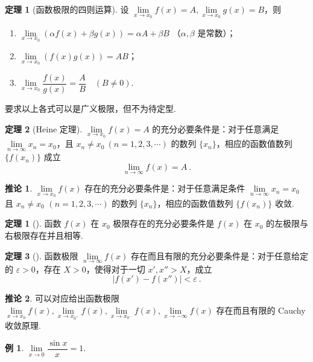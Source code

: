 \documentclass[zihao=-4,linespread=1.8,UTF8,nothm]{aytony_base}
\theoremstyle{definition}
\newtheorem*{theorem*}{\indent\heiti\textbf{定理}}
\newtheorem{theorem}{\indent\heiti\textbf{定理}}[subsection]
\newtheorem*{corollary}{\indent\heiti\textbf{推论}}
\newtheorem{example}{\indent\heiti\textbf{例}}[subsection]
\begin{document}
\begin{theorem}[函数极限的四则运算]
    设 $\lim\limits_{x \to x_0} f(x) = A, \lim\limits_{x \to x_0} g(x) = B$，则
    \begin{enumerate}
        \item $\lim\limits_{x \to x_0} (\alpha f(x) + \beta g(x)) = \alpha A + \beta B$ （$\alpha, \beta$ 是常数）；
        \item $\lim\limits_{x \to x_0}(f(x)g(x)) = AB $；
        \item $\lim\limits_{x \to x_0} \dfrac{f(x)}{g(x)} = \dfrac{A}{B}\quad(B \neq 0)$.
    \end{enumerate}
    要求以上各式可以是广义极限，但不为待定型.
\end{theorem}

\begin{theorem}[Heine 定理]
    $\lim\limits_{x \to x_0} f(x) = A$ 的充分必要条件是：对于任意满足 $\lim\limits_{n \to \infty} x_n = x_0$，且 $x_n \neq x_0\ (n = 1, 2, 3, \cdots)$ 的数列 $\{x_n\}$，相应的函数值数列 $\{f(x_n)\}$ 成立 $$
        \lim\limits_{n \to \infty} f(x) = A\ .
    $$
\end{theorem}

\begin{corollary}
    $\lim\limits_{x \to x_0} f(x)$ 存在的充分必要条件是：对于任意满足条件 $\lim\limits_{n \to \infty} x_n = x_0$ 且 $x_n \neq x_0$ $(n = 1, 2, 3, \cdots)$ 的数列 $\{x_n\}$，相应的函数值数列 $\{f(x_n)\}$ 收敛.
\end{corollary}

\begin{theorem*}[]
    函数 $f(x)$ 在 $x_0$ 极限存在的充分必要条件是 $f(x)$ 在 $x_0$ 的左极限与右极限存在并且相等.
\end{theorem*}

\begin{theorem}[]
    函数极限 $\lim\limits_{n \to \infty} f(x)$ 存在而且有限的充分必要条件是：对于任意给定的 $\varepsilon > 0$，存在 $X>0$，使得对于一切 $x', x'' > X$，成立 $$
        \left|f(x') - f(x'')\right| < \varepsilon\ .
    $$
\end{theorem}

\begin{corollary}
    可以对应给出函数极限 $\lim\limits_{x \to x_0} f(x),\lim\limits_{x \to x_{0^+}}f(x), \lim\limits_{x \to x_{0^-}}f(x),\lim\limits_{x \to -\infty}f(x)$ 存在而且有限的 Cauchy 收敛原理.
\end{corollary}

\setcounter{example}{3}
\begin{example}
    $\lim\limits_{x \to 0} \dfrac{\sin x}{x} = 1$.
\end{example}
\end{document}
